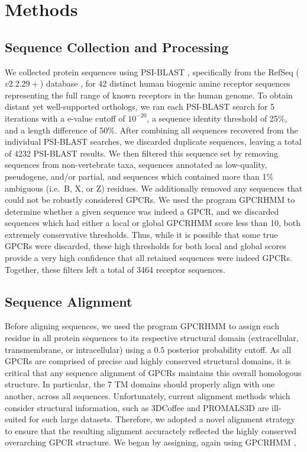 \documentclass[fleqn,10pt]{wlpeerj}
\begin{document}
\section*{Methods}

\subsection*{Sequence Collection and Processing}
We collected protein sequences using PSI-BLAST \citep{psiblast}, specifically from the RefSeq ($v2.2.29+$) database \citep{refseq}, for 42 distinct human biogenic amine receptor sequences representing the full range of known receptors in the human genome. To obtain distant yet well-supported orthologs, we ran each PSI-BLAST search for 5 iterations with a e-value cutoff of $10^{-20}$, a sequence identity threshold of 25\%, and a length difference of 50\%. After combining all sequences recovered from the individual PSI-BLAST searches, we discarded duplicate sequences, leaving a total of 4232 PSI-BLAST results. We then filtered this sequence set by removing sequences from non-vertebrate taxa, sequences annotated as low-quality, pseudogene, and/or partial, and sequences which contained more than 1\% ambiguous (i.e.\ B, X, or Z) residues. We additionally removed any sequences that could not be robustly considered GPCRs. We used the program GPCRHMM \citep{Wistrand2006} to determine whether a given sequence was indeed a GPCR, and we discarded sequences which had either a local or global GPCRHMM score less than 10, both extremely conservative thresholds. Thus, while it is possible that some true GPCRs were discarded, these high thresholds for both local and global scores provide a very high confidence that all retained sequences were indeed GPCRs. Together, these filters left a total of 3464 receptor sequences.


\subsection*{Sequence Alignment}
Before aligning sequences, we used the program GPCRHMM \citep{Wistrand2006} to assign each residue in all protein sequences to its respective structural domain (extracellular, transmembrane, or intracellular) using a $0.5$ posterior probability cutoff. As all GPCRs are comprised of precise and highly conserved structural domains, it is critical that any sequence alignment of GPCRs maintains this overall homologous structure. In particular, the 7 TM domains should properly align with one another, across all sequences. Unfortunately, current alignment methods which consider structural information, such as 3DCoffee \citep{3dcoffee} and PROMALS3D \citep{promals3d} are ill-suited for such large datasets. Therefore, we adopted a novel alignment strategy to ensure that the resulting alignment accuractely reflected the highly conserved overarching GPCR structure. We began by assigning, again using GPCRHMM \citep{Wistrand2006}, 
\end{document}
